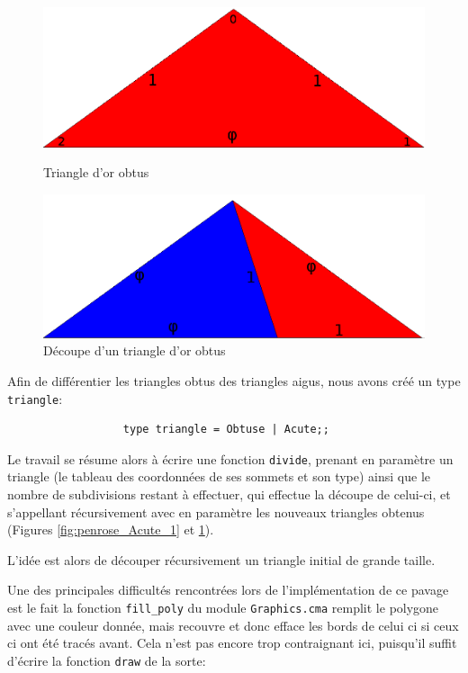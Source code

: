 \documentclass[a4paper, 11pt]{article}%
\begin{document}
\begin{figure}
			  \includegraphics[width=\linewidth]{penrose_Obtuse_0.png}
			  \caption{Triangle d'or obtus}\label{fig:penrose_Obtuse_0}
			\endminipage\hfill
			  \includegraphics[width=\linewidth]{penrose_Obtuse_1.png}
			  \caption{Découpe d'un triangle d'or obtus}\label{fig:penrose_Obtuse_1}
			\endminipage\hfill
		\end{figure}
                Afin de différentier les triangles obtus des triangles
                aigus, nous avons créé un type \texttt{triangle}:

		\begin{lstlisting}
                  type triangle = Obtuse | Acute;;
		\end{lstlisting}

                Le travail se résume alors à écrire une fonction \texttt{divide},
                prenant en paramètre un triangle (le tableau des
                coordonnées de ses sommets et son type) ainsi que
                le nombre de subdivisions restant à effectuer, qui
                effectue la découpe de celui-ci, et s'appellant
                récursivement avec en paramètre les nouveaux triangles
                obtenus (Figures \ref{fig:penrose_Acute_1} et \ref{fig:penrose_Obtuse_1}).

                L'idée est alors de découper récursivement un triangle
                initial de grande taille. 

                Une des principales difficultés rencontrées lors de
                l'implémentation de ce pavage est le fait la fonction
                \texttt{fill\_poly} du module \texttt{Graphics.cma}
                remplit le polygone avec une couleur donnée, mais
                recouvre et donc efface les bords de celui ci si ceux
                ci ont été tracés avant. Cela n'est pas encore trop
                contraignant ici, puisqu'il suffit d'écrire la
                fonction \texttt{draw} de la sorte:
\end{document}
